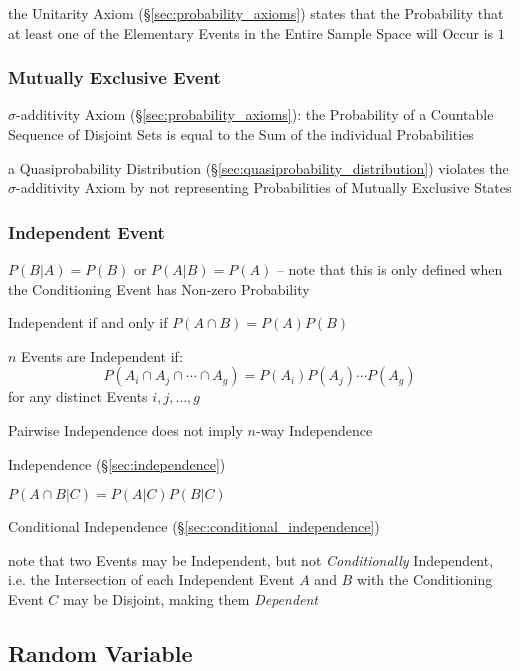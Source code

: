 the Unitarity Axiom (\S\ref{sec:probability_axioms}) states that the
Probability that at least one of the Elementary Events in the Entire Sample
Space will Occur is $1$



\subsubsection{Mutually Exclusive Event}\label{sec:mutually_exclusive}

$\sigma$-additivity Axiom (\S\ref{sec:probability_axioms}): the Probability of
a Countable Sequence of Disjoint Sets is equal to the Sum of the individual
Probabilities

a Quasiprobability Distribution (\S\ref{sec:quasiprobability_distribution})
violates the $\sigma$-additivity Axiom by not representing Probabilities of
Mutually Exclusive States



\subsubsection{Independent Event}\label{sec:independent_event}

$P(B|A) = P(B)$ or $P(A|B) = P(A)$ -- note that this is only defined when the
Conditioning Event has Non-zero Probability

Independent if and only if $P(A \cap B) = P(A) P(B)$

$n$ Events are Independent if:
\[
  P(A_i \cap A_j \cap \cdots \cap A_g) = P(A_i)P(A_j) \cdots P(A_g)
\]
for any distinct Events $i,j,\ldots,g$

Pairwise Independence does not imply $n$-way Independence

\fist Independence (\S\ref{sec:independence})

$P(A \cap B | C) = P(A|C)P(B|C)$

\fist Conditional Independence (\S\ref{sec:conditional_independence})

note that two Events may be Independent, but not \emph{Conditionally}
Independent, i.e. the Intersection of each Independent Event $A$ and $B$ with
the Conditioning Event $C$ may be Disjoint, making them \emph{Dependent}



\subsection{Random Variable}\label{sec:random_variable}

